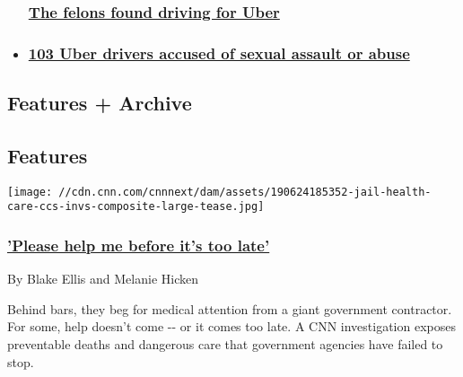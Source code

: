 \begin{itemize}
{  \subsubsection{\texorpdfstring{\href{/videos/us/2018/06/01/felons-driving-for-uber-griffin-dnt.cnn}{The
  felons found driving for
  Uber}}{The felons found driving for Uber}}\label{the-felons-found-driving-for-uber}}
\item
  \hypertarget{103-uber-drivers-accused-of-sexual-assault-or-abuse}{%
  \subsubsection{\texorpdfstring{\href{https://money.cnn.com/2018/04/30/technology/uber-driver-sexual-assault/index.html}{103
  Uber drivers accused of sexual assault or
  abuse}}{103 Uber drivers accused of sexual assault or abuse}}\label{103-uber-drivers-accused-of-sexual-assault-or-abuse}}
\end{itemize}

\hypertarget{features--archive-}{%
\subsection{Features + Archive~}\label{features--archive-}}

\hypertarget{features}{%
\subsection{Features}\label{features}}

\href{https://www.cnn.com/interactive/2019/06/us/jail-health-care-ccs-invs/}{}

\texttt{[image: //cdn.cnn.com/cnnnext/dam/assets/190624185352-jail-health-care-ccs-invs-composite-large-tease.jpg]}

\hypertarget{please-help-me-before-its-too-late}{%
\subsubsection{\texorpdfstring{\href{https://www.cnn.com/interactive/2019/06/us/jail-health-care-ccs-invs/}{'Please
help me before it's too
late'}}{'Please help me before it's too late'}}\label{please-help-me-before-its-too-late}}

By Blake Ellis and Melanie Hicken

Behind bars, they beg for medical attention from a giant government
contractor. For some, help doesn't come -\/- or it comes too late. A CNN
investigation exposes preventable deaths and dangerous care that
government agencies have failed to stop.

